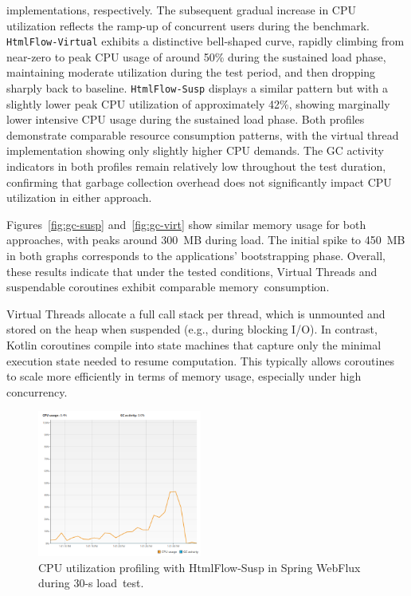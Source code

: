 \documentclass[software,article,accept,pdftex,moreauthors]{Definitions/mdpi}
\begin{document}
 implementations,
respectively. The subsequent gradual increase in CPU utilization reflects the
ramp-up of concurrent users during the benchmark. \texttt{HtmlFlow-Virtual}
exhibits a distinctive bell-shaped curve, rapidly climbing from near-zero to
peak CPU usage of around 50\% during the sustained load phase, maintaining
moderate utilization during the test period, and then dropping sharply back to
baseline. \texttt{HtmlFlow-Susp} displays a similar pattern but with a slightly
lower peak CPU utilization of approximately 42\%, showing marginally lower
intensive CPU usage during the sustained load phase. Both profiles demonstrate
comparable resource consumption patterns, with the virtual thread
implementation showing only slightly higher CPU demands. The GC activity
indicators in both profiles remain relatively low throughout the test duration,
confirming that garbage collection overhead does not significantly impact CPU
utilization in either approach.

Figures~\ref{fig:gc-susp} and~\ref{fig:gc-virt} show similar memory usage for
both approaches, with peaks around 300~MB during load. The initial spike to
450~MB in both graphs corresponds to the applications' bootstrapping phase.
Overall, these results indicate that under the tested conditions, Virtual
Threads and suspendable coroutines exhibit comparable memory~consumption.

Virtual Threads allocate a full call stack per thread, which is unmounted and
stored on the heap when suspended (e.g., during blocking I/O). In contrast,
Kotlin coroutines compile into state machines that capture only the minimal
execution state needed to resume computation. This typically allows coroutines
to scale more efficiently in terms of memory usage, especially under high
concurrency.

\begin{figure}[H]
\vspace{-3pt}
     \includegraphics[width=0.48\textwidth]{./Graphs/cpu-susp.png}
     \caption{CPU utilization profiling with HtmlFlow-Susp in Spring WebFlux during 30-s load~test.}     \label{fig:cpu-susp}
\end{figure}
\end{document}
